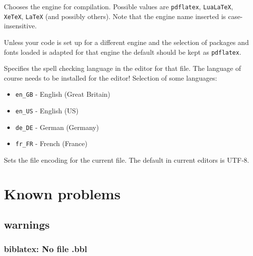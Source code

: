 \begin{latexcode}
\end{latexcode}
%
Chooses the engine for compilation. Possible values are \texttt{pdflatex}, \texttt{LuaLaTeX}, \texttt{XeTeX}, \texttt{LaTeX} (and possibly others). Note that the engine name inserted is case-insensitive.

Unless your code is set up for a different engine and the selection of  packages and fonts loaded is adapted for that engine the default should be kept as \texttt{pdflatex}. 

\begin{latexcode}
\end{latexcode}
%
Specifies the spell checking language in the editor for that file. 
The language of course needs to be installed for the editor!
%
Selection of some languages:
\begin{itemize}[noitemsep]
\item \texttt{en\_GB} - English (Great Britain)
\item \texttt{en\_US} - English (US)
\item \texttt{de\_DE} - German (Germany)
\item \texttt{fr\_FR} - French (France)
\end{itemize}

\begin{latexcode}
\end{latexcode}
%
Sets the file encoding for the current file. The default in current editors is UTF-8.


%
\chapter{Known problems}

\section{warnings}

\subsection{biblatex: No file .bbl}

